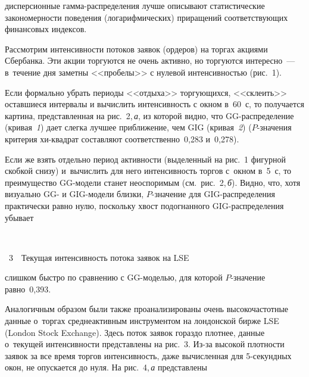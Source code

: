 \begin{multicols}{2}

\noindent
 дисперсионные гам\-ма-рас\-пре\-де\-ле\-ния лучше описывают
статистические закономерности поведения (логарифмических) приращений
соответствующих финансовых индексов.

Рассмотрим интенсивности потоков заявок (ордеров) на торгах акциями
Сбербанка. Эти акции торгуются не очень активно, но торгуются
интересно~--- в~течение дня заметны <<пробелы>> с нулевой
интенсивностью  (рис.~1).



Если формально убрать периоды <<отдыха>> торгующихся, <<склеить>>
оставшиеся интервалы и вычислить интенсивность с окном в~60~с,
то получается картина, представленная на рис.~2,\,\textit{а}, из которой
видно, что GG-рас\-пре\-де\-ле\-ние (кривая~\textit{1}) дает слегка лучшее
приближение, чем GIG (кривая~\textit{2}) ($P$-зна\-че\-ния критерия хи-квад\-рат составляют
соответственно~0,283 и~0,278).



Если же взять отдельно период активности (выделенный на рис.~1
фигурной скобкой снизу) и~вычислить для него интенсивность торгов 
с~окном в~5~с, то преимущество GG-мо\-де\-ли станет не\-оспо\-римым (см.\
рис.~2,\,\textit{б}). Видно, что, хотя визуально GG- и GIG-мо\-де\-ли близки,
$P$-значение для GIG-рас\-пре\-де\-ле\-ния практически равно нулю, поскольку
хвост подогнанного GIG-рас\-пре\-де\-ле\-ния убывает\linebreak\vspace*{-12pt}
\begin{center}  %
\vspace*{-1pt}
\mbox{%
 \epsfxsize=77.404mm
 }



\vspace*{3pt}

\noindent
{{\figurename~3}\ \ \small{Текущая интенсивность потока заявок на
LSE}}
 
\end{center}

\vspace*{6pt}


\addtocounter{figure}{1}

\noindent
 слишком быстро по
сравнению с GG-мо\-делью, для которой $P$-зна\-че\-ние равно~0,393.

Аналогичным образом были также проанализированы очень
высокочастотные данные о~торгах среднеактивным инструментом на
лондонской бирже LSE (London Stock Exchange). Здесь поток заявок гораздо плотнее, данные 
о~текущей интенсивности представлены на рис.~3. Из-за
высокой плотности заявок за все время торгов интенсивность, даже
вычисленная для 5-се\-кунд\-ных окон, не опускается до нуля. На рис.~4,\,\textit{а}
представлены\linebreak\vspace*{-12pt}


\end{multicols}
